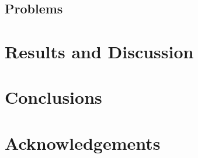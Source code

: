 \documentclass[letterpaper]{article}
\begin{document}
\subsection{Problems}


\section{Results and Discussion}

\section{Conclusions}

\section{Acknowledgements}


\footnotesize

\end{document}
